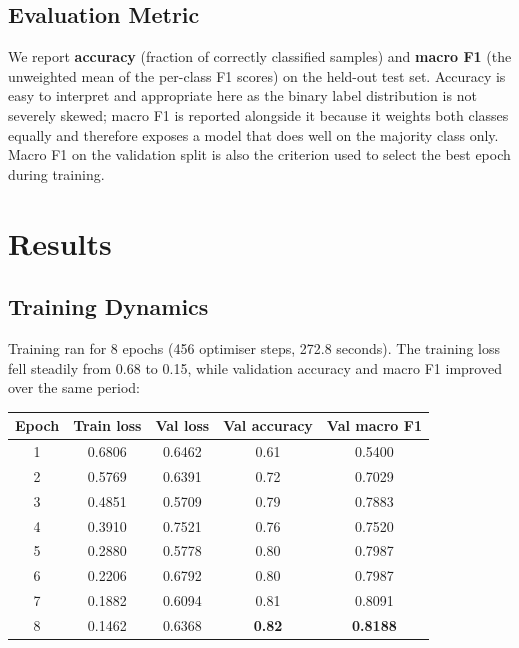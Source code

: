 \documentclass[11pt,a4paper]{article}
\begin{document}
\subsection{Evaluation Metric}

We report \textbf{accuracy} (fraction of correctly classified samples) and \textbf{macro F1} (the unweighted mean of the per-class F1 scores) on the held-out test set. Accuracy is easy to interpret and appropriate here as the binary label distribution is not severely skewed; macro F1 is reported alongside it because it weights both classes equally and therefore exposes a model that does well on the majority class only. Macro F1 on the validation split is also the criterion used to select the best epoch during training.

\section{Results}
\label{sec:results}

\subsection{Training Dynamics}

Training ran for 8 epochs (456 optimiser steps, 272.8 seconds). The training loss fell steadily from 0.68 to 0.15, while validation accuracy and macro F1 improved over the same period:

\begin{center}
\begin{tabular}{ccccc}
\toprule
\textbf{Epoch} & \textbf{Train loss} & \textbf{Val loss} & \textbf{Val accuracy} & \textbf{Val macro F1} \\
\midrule
1 & 0.6806 & 0.6462 & 0.61 & 0.5400 \\
2 & 0.5769 & 0.6391 & 0.72 & 0.7029 \\
3 & 0.4851 & 0.5709 & 0.79 & 0.7883 \\
4 & 0.3910 & 0.7521 & 0.76 & 0.7520 \\
5 & 0.2880 & 0.5778 & 0.80 & 0.7987 \\
6 & 0.2206 & 0.6792 & 0.80 & 0.7987 \\
7 & 0.1882 & 0.6094 & 0.81 & 0.8091 \\
8 & 0.1462 & 0.6368 & \textbf{0.82} & \textbf{0.8188} \\
\bottomrule
\end{tabular}
\end{center}
\end{document}
